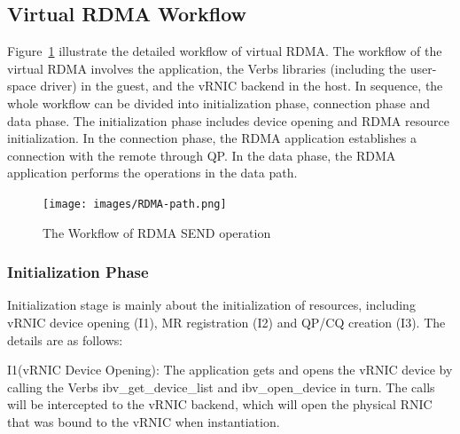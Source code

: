 \subsection{Virtual RDMA Workflow}


Figure~\ref{fig:rdma-path} illustrate the detailed workflow of virtual RDMA. The workflow of the virtual RDMA involves the application, the Verbs libraries (including the user-space driver) in the guest, and the vRNIC backend in the host. In sequence, the whole workflow can be divided into initialization phase, connection phase and data phase. The initialization phase includes device opening and RDMA resource initialization. In the connection phase, the RDMA application establishes a connection with the remote through QP. In the data phase, the RDMA application performs the operations in the data path.

\begin{figure}[!ht]
	\centering
	\texttt{[image: images/RDMA-path.png]}
	\caption{The Workflow of RDMA SEND operation}
	\label{fig:rdma-path}
\end{figure}

\subsubsection{Initialization Phase}
Initialization stage is mainly about the initialization of resources, including vRNIC device opening (I1), MR registration (I2) and QP/CQ creation (I3). The details are as follows:


I1(vRNIC Device Opening): The application gets and opens the vRNIC device by calling the Verbs ibv\_get\_device\_list and ibv\_open\_device in turn. The calls will be intercepted to the vRNIC backend, which will open the physical RNIC that was bound to the vRNIC when instantiation.

